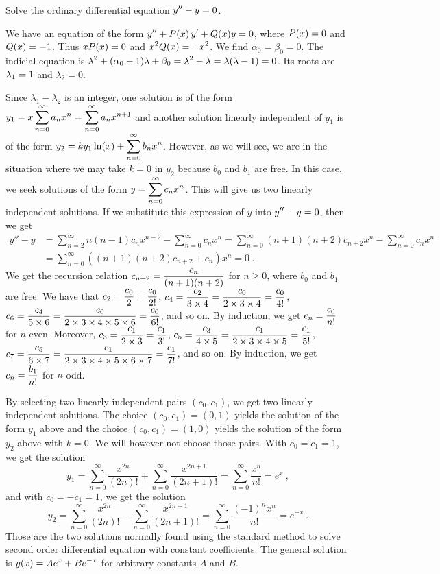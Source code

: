 \begin{egg}
Solve the ordinary differential equation $\displaystyle y''- y = 0$.

We have an equation of the form
$\displaystyle y'' + P(x)\, y' + Q(x) y = 0$, where
$\displaystyle P(x) = 0$ and $\displaystyle Q(x) = -1$.
Thus $\displaystyle x P(x) = 0$ and
$\displaystyle x^2 Q(x) = -x^2$.  We find $\alpha_0 = \beta_0= 0$.
The indicial equation is
$\displaystyle \lambda^2 + (\alpha_0 - 1) \lambda + \beta_0 =
\lambda^2 - \lambda = \lambda(\lambda -1) = 0$.
Its roots are $\displaystyle \lambda_1 = 1$ and $\lambda_2=0$.

Since $\lambda_1-\lambda_2$ is an integer, one solution is of the form
$\displaystyle y_1 = x \sum_{n=0}^\infty a_n x^n = \sum_{n=0}^\infty a_n x^{n+1}$
and another solution linearly independent of $y_1$ is of the form
$\displaystyle y_2 = k y_1 \ln(x) + \sum_{n=0}^\infty b_n x^n$.
However, as we will see, we are in the situation where we may take
$k=0$ in $y_2$ because $b_0$ and $b_1$ are free.  In this case, we
seek solutions of the form
$\displaystyle y = \sum_{n=0}^\infty c_n x^n$.
This will give us two linearly independent solutions.
If we substitute this expression of $y$ into $\displaystyle y''- y = 0$,
then we get 
\begin{align*}
y''- y & = \sum_{n=2}^\infty n(n-1) c_n x^{n-2} - \sum_{n=0}^\infty c_n x^n
= \sum_{n=0}^\infty (n+1)(n+2) c_{n+2} x^n - \sum_{n=0}^\infty c_n x^n \\
&= \sum_{n=0}^\infty \left( (n+1)(n+2)c_{n+2} + c_n\right) x^n = 0 \  .
\end{align*}
We get the recursion relation
$\displaystyle c_{n+2} = \frac{c_n}{(n+1)(n+2)}$
for $n \geq 0$, where $b_0$ and $b_1$ are free.  We have that
$\displaystyle c_2 = \frac{c_0}{2} = \frac{c_0}{2!}$,
$\displaystyle c_4 = \frac{c_2}{3\times 4} = \frac{c_0}{2\times 3 \times 4} 
= \frac{c_0}{4!}$,
$\displaystyle c_6 = \frac{c_4}{5\times 6} = \frac{c_0}{2\times 3
\times 4 \times 5 \times 6} = \frac{c_0}{6!}$, and so on.
By induction, we get $\displaystyle c_n = \frac{c_0}{n!}$ for $n$ even.
Moreover,
$\displaystyle c_3 = \frac{c_1}{2\times 3} = \frac{c_1}{3!}$,
$\displaystyle c_5 = \frac{c_3}{4\times 5} = \frac{c_1}{2\times
3\times 4 \times 5} = \frac{c_1}{5!}$,
$\displaystyle c_7 = \frac{c_5}{6\times 7} = \frac{c_1}{2\times
3\times 4 \times 5 \times 6 \times 7} = \frac{c_1}{7!}$, and so on.
By induction, we get
$\displaystyle c_n = \frac{b_1}{n!}$ for $n$ odd.

By selecting two linearly independent pairs $(c_0,c_1)$, we get two
linearly independent solutions.  The choice $(c_0,c_1) = (0,1)$ yields
the solution of the form $y_1$ above and the choice $(c_0,c_1)= (1,0)$
yields the solution of the form $y_2$ above with $k=0$.  We will
however not choose those pairs.  With $c_0=c_1 =1$, we get the solution
\[
y_1 = \sum_{n=0}^\infty \frac{x^{2n}}{(2n)!}
+ \sum_{n=0}^\infty \frac{x^{2n+1}}{(2n+1)!} 
= \sum_{n=0}^\infty \frac{x^{n}}{n!}  = e^x \  ,
\]
and with $c_0 = -c_1 = 1$, we get the solution
\[
y_2 = \sum_{n=0}^\infty \frac{x^{2n}}{(2n)!}
- \sum_{n=0}^\infty \frac{x^{2n+1}}{(2n+1)!} 
= \sum_{n=0}^\infty \frac{(-1)^nx^{n}}{n!}  = e^{-x} \  .
\]
Those are the two solutions normally found using the standard method
to solve second order differential equation with constant
coefficients.  The general solution is
$\displaystyle y(x) = A e^x + B e^{-x}$ for arbitrary constants $A$
and $B$.
\end{egg}

